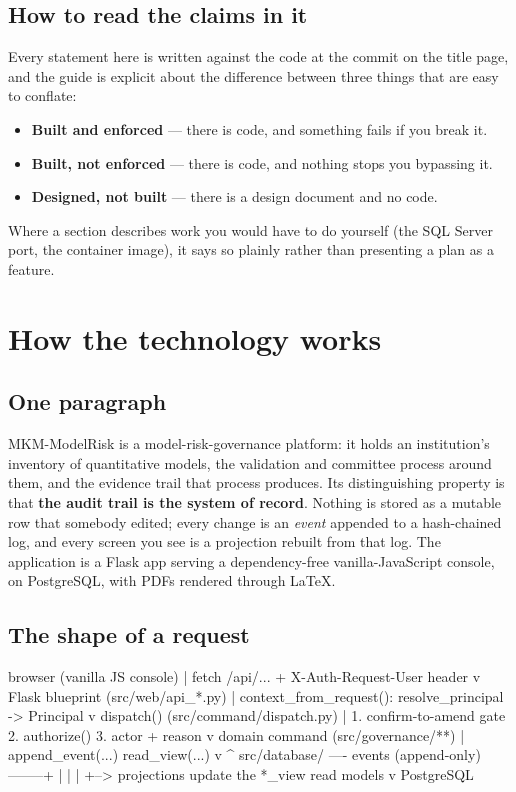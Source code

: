 \documentclass[11pt]{article}
\begin{document}
\subsection{How to read the claims in it}

Every statement here is written against the code at the commit on the title page, and the
guide is explicit about the difference between three things that are easy to conflate:

\begin{itemize}
  \item \textbf{Built and enforced} --- there is code, and something fails if you break it.
  \item \textbf{Built, not enforced} --- there is code, and nothing stops you bypassing it.
  \item \textbf{Designed, not built} --- there is a design document and no code.
\end{itemize}

Where a section describes work you would have to do yourself (the SQL Server port, the
container image), it says so plainly rather than presenting a plan as a feature.

\clearpage
\section{How the technology works}

\subsection{One paragraph}

MKM-ModelRisk is a model-risk-governance platform: it holds an institution's inventory of
quantitative models, the validation and committee process around them, and the evidence
trail that process produces. Its distinguishing property is that \textbf{the audit trail is
the system of record}. Nothing is stored as a mutable row that somebody edited; every
change is an \emph{event} appended to a hash-chained log, and every screen you see is a
projection rebuilt from that log. The application is a Flask app serving a dependency-free
vanilla-JavaScript console, on PostgreSQL, with PDFs rendered through \LaTeX.

\subsection{The shape of a request}

\begin{code}
  browser (vanilla JS console)
        |  fetch /api/...  + X-Auth-Request-User header
        v
  Flask blueprint  (src/web/api_*.py)
        |  context_from_request(): resolve_principal -> Principal
        v
  dispatch()       (src/command/dispatch.py)
        |  1. confirm-to-amend gate   2. authorize()   3. actor + reason
        v
  domain command   (src/governance/**)
        |  append_event(...)                    read_view(...)
        v                                            ^
  src/database/    ---- events (append-only) --------+
        |                     |
        |                     +--> projections update the *_view read models
        v
  PostgreSQL
\end{code}
\end{document}
